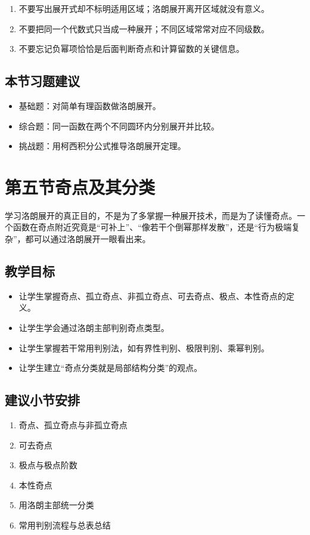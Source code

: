 \begin{jinshi}[本节易错点]
\begin{enumerate}
    \item 不要写出展开式却不标明适用区域；洛朗展开离开区域就没有意义。
    \item 不要把同一个代数式只当成一种展开；不同区域常常对应不同级数。
    \item 不要忘记负幂项恰恰是后面判断奇点和计算留数的关键信息。
\end{enumerate}
\end{jinshi}

\subsection*{本节习题建议}
\begin{itemize}
    \item 基础题：对简单有理函数做洛朗展开。
    \item 综合题：同一函数在两个不同圆环内分别展开并比较。
    \item 挑战题：用柯西积分公式推导洛朗展开定理。
\end{itemize}

\section{第五节\quad 奇点及其分类}

\begin{wulibj}[本节要解决的问题]
学习洛朗展开的真正目的，不是为了多掌握一种展开技术，而是为了读懂奇点。一个函数在奇点附近究竟是``可补上''、``像若干个倒幂那样发散''，还是``行为极端复杂''，都可以通过洛朗展开一眼看出来。
\end{wulibj}

\subsection*{教学目标}
\begin{itemize}
    \item 让学生掌握奇点、孤立奇点、非孤立奇点、可去奇点、极点、本性奇点的定义。
    \item 让学生学会通过洛朗主部判别奇点类型。
    \item 让学生掌握若干常用判别法，如有界性判别、极限判别、乘幂判别。
    \item 让学生建立``奇点分类就是局部结构分类''的观点。
\end{itemize}

\subsection*{建议小节安排}
\begin{enumerate}
    \item 奇点、孤立奇点与非孤立奇点
    \item 可去奇点
    \item 极点与极点阶数
    \item 本性奇点
    \item 用洛朗主部统一分类
    \item 常用判别流程与总表总结
\end{enumerate}

